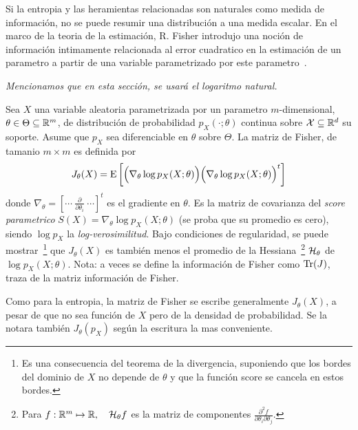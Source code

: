 




Si  la entropia  y las  heramientas relacionadas  son naturales  como  medida de
informaci\'on, no se  puede resumir una distribuci\'on a  una medida escalar. En
el marco  de la teoria de la  estimaci\'on, R. Fisher introdujo  una noci\'on de
informaci\'on intimamente relacionada al  error cuadratico en la estimaci\'on de
un   parametro    a   partir   de   una   variable    parametrizado   por   este
parametro~\cite{Fis22,  Fis25:07,   Kay93,  Bos07,  CovTho06, Fri04}.

{\it Mencionamos que en esta secci\'on, se usar\'a el logaritmo natural.}
%
\begin{definicion}
  Sea $X$ una variable aleatoria parametrizada por un parametro $m$-dimensional,
  $\theta  \in  \Theta \subseteq  \mathbb{R}^m$,  de  distribuci\'on de  probabilidad
  $p_X(\cdot;\theta)$ continua  sobre $\mathcal{X}  \subseteq \mathbb{R}^d$ su  soporte. Asume
  que $p_X$ sea diferenciable en  $\theta$ sobre $\Theta$.  La matriz de Fisher,
  de  tamanio $m \times  m$ es  definida por
  \[
  J_\theta(X)  =  \operatorname{E}\left[  \Big(  \nabla_\theta \log  p_X(X;\theta)  \Big)
    \Big( \nabla_\theta \log p_X(X;\theta) \Big)^t \right]
  \]
  donde $\nabla_\theta = \left[  \cdots \: \frac{\partial}{\partial \theta_i} \:
    \cdots \right]^t$ es  el gradiente en $\theta$.  Es  la matriz de covarianza
  del  {\it score  parametrico} $S(X)  = \nabla_\theta  \log  p_X(X;\theta)$ (se
  proba que su promedio es  cero), siendo $\log p_X$ la {\it log-verosimilitud}.
  Bajo   condiciones   de  regularidad,   se   puede  mostrar~\footnote{Es   una
    consecuencia del  teorema de la  divergencia, suponiendo que los  bordes del
    dominio de $X$ no depende de $\theta$ y que la funci\'on score se cancela en
    estos  bordes.}  que  $J_\theta(X)$ es  tambi\'en  menos el  promedio de  la
  Hessiana~\footnote{Para $f:  \mathbb{R}^m \mapsto \mathbb{R}, \quad  \mathcal{H}_\theta f$ es
    la  matriz de  componentes $\frac{\partial^2  f}{\partial  \theta_i \partial
      \theta_j}$.}  $\mathcal{H}_\theta$ de  $\log  p_X(X;\theta)$.  Nota:  a veces  se
  define  la  informaci\'on  de  Fisher   como  $\operatorname{Tr}(J)$,  traza  de  la  matriz
  informaci\'on de Fisher.
\end{definicion}
%
Como  para   la  entropia,   la  matriz  de   Fisher  se   escribe  generalmente
$J_\theta(X)$, a  pesar de que no  sea funci\'on de  $X$ pero de la  densidad de
probabilidad. Se  la notara tambi\'en  $J_\theta(p_X)$ seg\'un la  escritura la
mas conveniente.

